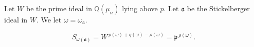 Let $W$ be the prime ideal in $\mathbb{Q}(\mu_n)$ lying above $p$. Let $\mathfrak{a}$ be the Stickelberger ideal in $W$. We let $\omega = \omega_{\mathfrak{a}}$.

$$S_{\omega(\mathfrak{a})} = W^{\,p(\omega) + q(\omega) - \rho(\omega)} = \mathfrak{p}^{\,\rho(\omega)}.$$
